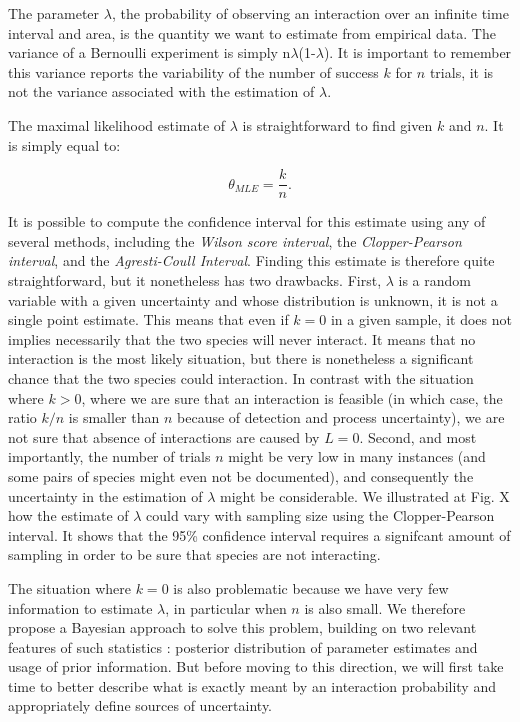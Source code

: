 \documentclass[12pt]{article}
\begin{document}
\noindent The parameter $\lambda$, the probability of observing an interaction over an infinite time interval and area, is the quantity we want to estimate from empirical data. The variance of a Bernoulli experiment is simply n$\lambda$(1-$\lambda$). It is important to remember this variance reports the variability of the number of success $k$ for $n$ trials, it is not the variance associated with the estimation of $\lambda$.

The maximal likelihood estimate of $\lambda$ is straightforward to find given $k$ and $n$. It is simply equal to:

    \begin{equation}
      \theta_{MLE} = \frac{k}{n}  .
      \label{theta_MLE}
    \end{equation}

It is possible to compute the confidence interval for this estimate using any of several methods, including the \emph{Wilson score interval}, the \emph{Clopper-Pearson interval}, and the \emph{Agresti-Coull Interval}. Finding this estimate is therefore quite straightforward, but it nonetheless has two drawbacks. First, $\lambda$ is a random variable with a given uncertainty and whose distribution is unknown, it is not a single point estimate. This means that even if $k = 0$ in a given sample, it does not implies necessarily that the two species will never interact. It means that no interaction is the most likely situation, but there is nonetheless a significant chance that the two species could interaction. In contrast with the situation where $k>0$, where we are sure that an interaction is feasible (in which case, the ratio $k/n$ is smaller than $n$ because of detection and process uncertainty), we are not sure that absence of interactions are caused by $L=0$. Second, and most importantly, the number of trials $n$ might be very low in many instances (and some pairs of species might even not be documented), and consequently the uncertainty in the estimation of $\lambda$ might be considerable. We illustrated at Fig. X how the estimate of $\lambda$ could vary with sampling size using the Clopper-Pearson interval. It shows that the 95\% confidence interval requires a signifcant amount of sampling in order to be sure that species are not interacting. 

The situation where $k = 0$ is also problematic because we have very few information to estimate $\lambda$, in particular when $n$ is also small. We therefore propose a Bayesian approach to solve this problem, building on two relevant features of such statistics : posterior distribution of parameter estimates and usage of prior information. But before moving to this direction, we will first take time to better describe what is exactly meant by an interaction probability and appropriately define sources of uncertainty.
\end{document}
